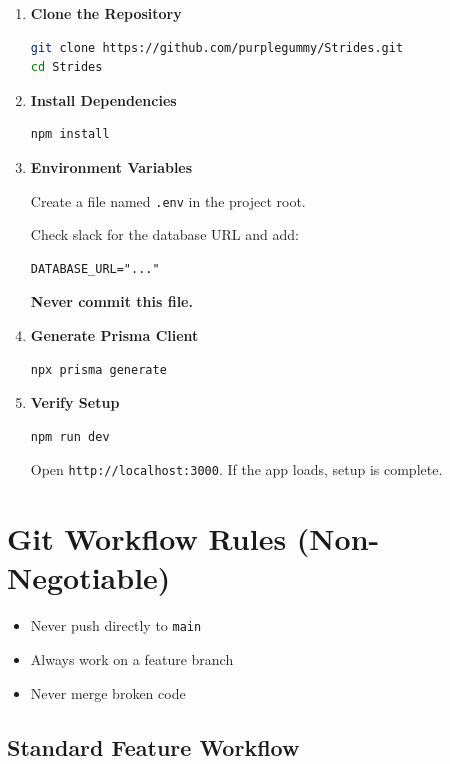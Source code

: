 \documentclass[11pt]{article}
\begin{document}
\begin{enumerate}
    \item \textbf{Clone the Repository}
\begin{lstlisting}[language=bash]
git clone https://github.com/purplegummy/Strides.git
cd Strides
\end{lstlisting}

    \item \textbf{Install Dependencies}
\begin{lstlisting}[language=bash]
npm install
\end{lstlisting}

    \item \textbf{Environment Variables}

    Create a file named \texttt{.env} in the project root.

    Check slack for the database URL and add:
\begin{lstlisting}
DATABASE_URL="..."
\end{lstlisting}

\textbf{Never commit this file.}

    \item \textbf{Generate Prisma Client}
\begin{lstlisting}[language=bash]
npx prisma generate
\end{lstlisting}

    \item \textbf{Verify Setup}
\begin{lstlisting}[language=bash]
npm run dev
\end{lstlisting}

Open \texttt{http://localhost:3000}. If the app loads, setup is complete.
\end{enumerate}

\section{Git Workflow Rules (Non-Negotiable)}

\begin{itemize}
    \item Never push directly to \texttt{main}
    \item Always work on a feature branch
    \item Never merge broken code
\end{itemize}

\subsection*{Standard Feature Workflow}
\end{document}

